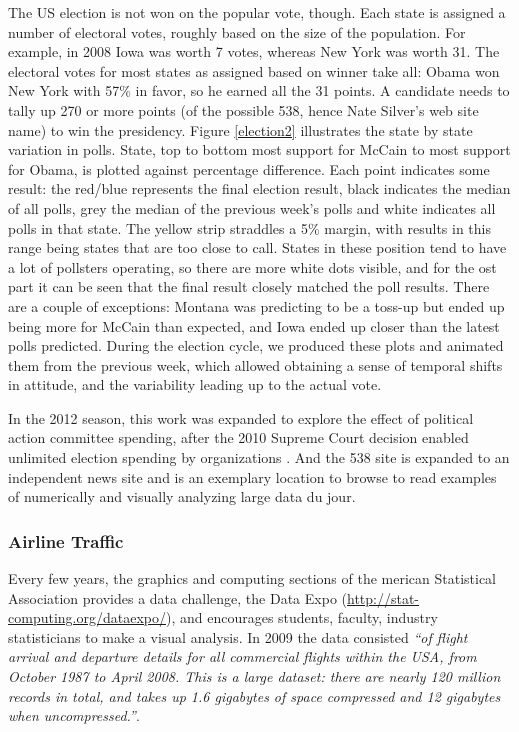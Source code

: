 \documentclass{article}
\begin{document}
The US election is not won on the popular vote, though. Each state is assigned a number of electoral votes, roughly based on the size of the population. For example, in 2008 Iowa was worth 7 votes, whereas New York was worth 31. The electoral votes for most states as assigned based on winner take all: Obama won New York with 57\% in favor, so he earned all the 31 points. A candidate needs to tally up 270 or more points (of the possible 538, hence Nate Silver's web site name) to win the presidency. Figure \ref{election2} illustrates the state by state variation in polls. State, top to bottom most support for McCain to most support for Obama, is plotted against percentage difference. Each point indicates some result: the red/blue represents the final election result, black indicates the median of all polls, grey the median of the previous week's polls and white indicates all polls in that state. The yellow strip straddles a 5\% margin, with results in this range being states that are too close to call. States in these position tend to have a lot of pollsters operating, so there are more white dots visible, and for the ost part it can be seen that the final result closely matched the poll results. There are a couple of exceptions: Montana was predicting to be a toss-up but ended up being more for McCain than expected, and Iowa ended up closer than the latest polls predicted. During the election cycle, we produced these plots and animated them from the previous week, which allowed obtaining a sense of temporal shifts in attitude, and the variability leading up to the actual vote. 

In the 2012 season, this work was expanded to explore the effect of political action committee spending, after the 2010 Supreme Court decision enabled unlimited election spending by organizations \citep{kaplan2012}. And the 538 site is expanded to an independent news site and is an exemplary location to browse to read examples of numerically and visually analyzing large data du jour.  

\subsubsection{Airline Traffic}

Every few years, the graphics and computing sections of the merican Statistical Association provides a data challenge, the Data Expo (\url{http://stat-computing.org/dataexpo/}), and encourages students, faculty, industry statisticians to make a visual analysis. In 2009 the data consisted {\em ``of flight arrival and departure details for all commercial flights within the USA, from October 1987 to April 2008. This is a large dataset: there are nearly 120 million records in total, and takes up 1.6 gigabytes of space compressed and 12 gigabytes when uncompressed.''}. 
\end{document}
